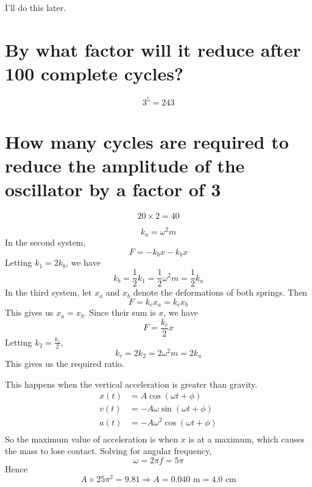 \documentclass[answers]{exam}
\begin{document}
\begin{questions}
	\begin{solution}
		I'll do this later.
	\end{solution}

	\begin{parts}
		\part{By what factor will it reduce after 100 complete cycles?}
		\begin{solution}
			$$3^5 = 243$$
		\end{solution}
		\part{How many cycles are required to reduce the amplitude of the oscillator by a factor of 3}
		\begin{solution}
			$$20 \times 2 = 40$$
		\end{solution}
	\end{parts}

	\begin{solution}
		$$k_a = \omega^2m$$
		In the second system,
		$$F = -k_bx-k_bx$$
		Letting $k_1 = 2k_b$, we have
		$$k_b = \frac{1}{2}k_1 = \frac{1}{2}\omega^2m = \frac{1}{2}k_a$$
		In the third system, let $x_a$ and $x_b$ denote the deformations of both springs. Then
		$$F = k_cx_a = k_cx_b$$
		This gives us $x_a=x_b$. Since their sum is $x$, we have
		$$F = \frac{k_c}{2} x$$
		Letting $k_2 = \frac{k_c}{2}$,
		$$k_c = 2k_2 = 2\omega^2m = 2k_a$$
		This gives us the required ratio.
	\end{solution}

	\begin{solution}
		This happens when the vertical acceleration is greater than gravity.
		\begin{align*}
			x(t) &= A\cos(\omega t + \phi) \\
			v(t) &= -A\omega\sin(\omega t + \phi) \\
			a(t) &= -A\omega^2\cos(\omega t + \phi) \\
		\end{align*}
		So the maximum value of acceleration is when $x$ is at a maximum, which causes the mass to lose contact. Solving for angular frequency,
		$$\omega = 2\pi f = 5\pi$$
		Hence
		$$A \times 25\pi^2 = 9.81 \Rightarrow A = 0.040 \text{ m} = 4.0 \text{ cm}$$
	\end{solution}
	

\end{questions}
\end{document}
